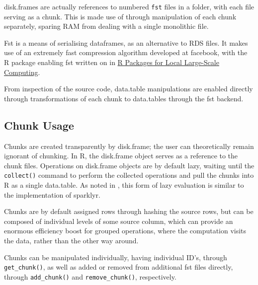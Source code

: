 \documentclass[10pt,a4paper]{article}
\begin{document}
disk.frames are actually references to numbered \texttt{fst} files in
a folder, with each file serving as a chunk. This is made use of
through manipulation of each chunk separately, sparing RAM from
dealing with a single monolithic file\cite{zj19:_inges_data}.

Fst is a means of serialising dataframes, as an alternative to RDS
files\cite{klik19}. It makes use of an extremely fast compression
algorithm developed at facebook, with the R package enabling fst
written on in \href{survey-r-packages-for-local-large-scale-computing.pdf}{R
  Packages for Local Large-Scale Computing}.

From inspection of the source code, data.table manipulations are
enabled directly through transformations of each chunk to data.tables
through the fst backend.

\subsection{Chunk Usage}
\label{sec:making-chunks}

Chunks are created transparently by disk.frame; the user can
theoretically remain ignorant of chunking. In R, the disk.frame object
serves as a reference to the chunk files. Operations on disk.frame
objects are by default lazy, waiting until the \texttt{collect()}
command to perform the collected operations and pull the chunks into R
as a single data.table. As noted in
\cite{zj19:_simpl_verbs_lazy_evaluat}, this form of lazy evaluation is
similar to the implementation of sparklyr.

Chunks are by default assigned rows through hashing the source rows,
but can be composed of individual levels of some source column, which
can provide an enormous efficiency boost for grouped operations, where
the computation visits the data, rather than the other way around.

Chunks can be manipulated individually, having individual ID's,
through \texttt{get\_chunk()}, as well as added or removed from
additional fst files directly, through \texttt{add\_chunk()} and
\texttt{remove\_chunk()}, respectively.
\end{document}
